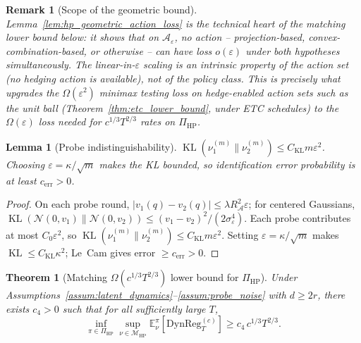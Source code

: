 \documentclass[11pt]{article}
\newcommand{\E}{\mathbb{E}}
\newcommand{\cA}{\mathcal{A}}
\newcommand{\DynReg}{\mathrm{DynReg}}
\DeclareMathOperator{\KL}{KL}
\newtheorem{lemma}{Lemma}
\newtheorem{theorem}{Theorem}
\newtheorem{remark}{Remark}
\begin{document}
\begin{remark}[Scope of the geometric bound]
\label{rem:geometric_scope}
Lemma~\ref{lem:hp_geometric_action_loss} is the technical heart of the
matching lower bound below: it shows that on $\cA_\varepsilon$,
\emph{no} action -- projection-based, convex-combination-based, or
otherwise -- can have loss $o(\varepsilon)$ under both hypotheses
simultaneously.  The linear-in-$\varepsilon$ scaling is an intrinsic
property of the action set (no hedging action is available), not of the
policy class.  This is precisely what upgrades the
$\Omega(\varepsilon^2)$ minimax testing loss on hedge-enabled action
sets such as the unit ball (Theorem~\ref{thm:etc_lower_bound}, under ETC
schedules) to the $\Omega(\varepsilon)$ loss needed for $c^{1/3}T^{2/3}$
rates on $\Pi_{\mathrm{HP}}$.
\end{remark}

\begin{lemma}[Probe indistinguishability]
\label{lem:hp_probe_kl}
$\KL(\nu_1^{(m)}\|\nu_2^{(m)})\le C_{\mathrm{KL}}m\varepsilon^2$.
Choosing $\varepsilon=\kappa/\sqrt{m}$ makes the KL bounded, so identification error
probability is at least $c_{\mathrm{err}}>0$.
\end{lemma}

\begin{proof}
On each probe round, $|v_1(q)-v_2(q)|\le\lambda R_{\cA}^2\varepsilon$; for
centered Gaussians,
$\KL(\mathcal{N}(0,v_1)\|\mathcal{N}(0,v_2))\le(v_1-v_2)^2/(2\sigma_\varepsilon^4)$.
Each probe contributes at most $C_0\varepsilon^2$, so
$\KL(\nu_1^{(m)}\|\nu_2^{(m)})\le C_{\mathrm{KL}}m\varepsilon^2$.
Setting $\varepsilon=\kappa/\sqrt{m}$ makes $\KL\le C_{\mathrm{KL}}\kappa^2$;
Le~Cam gives error $\ge c_{\mathrm{err}}>0$.
\end{proof}

\begin{theorem}[Matching $\Omega(c^{1/3}T^{2/3})$ lower bound for $\Pi_{\mathrm{HP}}$]
\label{thm:probe_rate_lb}
Under Assumptions~\ref{assum:latent_dynamics}--\ref{assum:probe_noise} with $d\ge 2r$,
there exists $c_4>0$ such that for all sufficiently large $T$,
\[
\inf_{\pi\in\Pi_{\mathrm{HP}}}
\sup_{\nu\in\mathcal{M}_{\mathrm{HP}}}
\E_\nu^\pi[\DynReg_T^{(c)}]
\ge c_4\,c^{1/3}T^{2/3}.
\]
\end{theorem}
\end{document}
